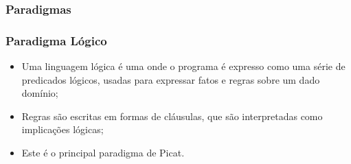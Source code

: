 \subsubsection{Paradigmas}
\begin{frame}
	\frametitle{Paradigma Lógico}
    
    \begin{itemize}
    
    	\item Uma linguagem lógica é uma onde o programa é expresso como uma série
        de predicados lógicos, usadas para expressar fatos e regras sobre um dado domínio;
    
    	\item Regras são escritas em formas de cláusulas, que são interpretadas como
        implicações lógicas;
        
        \item Este é o principal paradigma de Picat.
    \end{itemize}

\end{frame}


